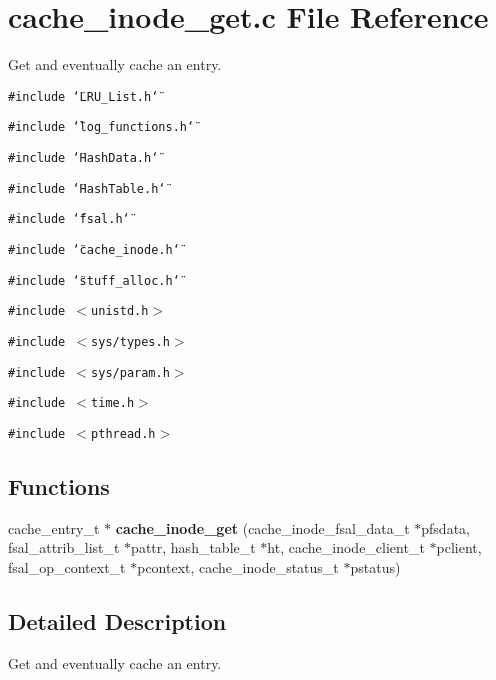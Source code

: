 \section{cache\_\-inode\_\-get.c File Reference}
\label{cache__inode__get_8c}
Get and eventually cache an entry. 

{\tt \#include \char`\"{}LRU\_\-List.h\char`\"{}}\par
{\tt \#include \char`\"{}log\_\-functions.h\char`\"{}}\par
{\tt \#include \char`\"{}Hash\-Data.h\char`\"{}}\par
{\tt \#include \char`\"{}Hash\-Table.h\char`\"{}}\par
{\tt \#include \char`\"{}fsal.h\char`\"{}}\par
{\tt \#include \char`\"{}cache\_\-inode.h\char`\"{}}\par
{\tt \#include \char`\"{}stuff\_\-alloc.h\char`\"{}}\par
{\tt \#include $<$unistd.h$>$}\par
{\tt \#include $<$sys/types.h$>$}\par
{\tt \#include $<$sys/param.h$>$}\par
{\tt \#include $<$time.h$>$}\par
{\tt \#include $<$pthread.h$>$}\par
\subsection*{Functions}
\begin{CompactItemize}
\item 
cache\_\-entry\_\-t $\ast$ {\bf cache\_\-inode\_\-get} (cache\_\-inode\_\-fsal\_\-data\_\-t $\ast$pfsdata, fsal\_\-attrib\_\-list\_\-t $\ast$pattr, hash\_\-table\_\-t $\ast$ht, cache\_\-inode\_\-client\_\-t $\ast$pclient, fsal\_\-op\_\-context\_\-t $\ast$pcontext, cache\_\-inode\_\-status\_\-t $\ast$pstatus)
\end{CompactItemize}


\subsection{Detailed Description}
Get and eventually cache an entry. 

